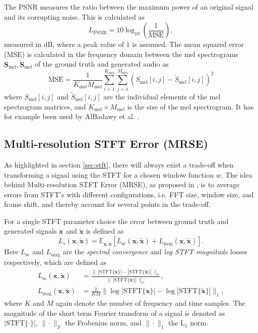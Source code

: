 \documentclass{report}
\begin{document}
The PSNR measures the ratio between the maximum power of an original signal and its corrupting noise. This is calculated as 
\begin{equation}
    L_{\text{PSNR}} = 10 \log_{10}\left(\frac{1}{\text{MSE}}\right),
\end{equation}
measured in dB, where a peak value of 1 is assumed. The mean squared error (MSE) is calculated in the frequency domain between the mel spectrograms $\bm{S}_{\text{mel}}, \tilde{\bm{S}}_{\text{mel}}$ of the ground truth and generated audio as
\begin{equation}
    \text{MSE} = \frac{1}{K_{\text{mel}}M_{\text{mel}}}\sum_{i=1}^{K_{\text{mel}}} \sum_{j=1}^{M_{\text{mel}}} \left( S_{\text{mel}}[i, j] - \tilde{S}_{\text{mel}}[i,j] \right)^2
\end{equation}
where $S_{\text{mel}}[i, j]$ and $\tilde{S}_{\text{mel}}[i,j]$ are the individual elements of the mel spectrogram matrices, and $K_{\text{mel}} \times M_{\text{mel}}$ is the size of the mel spectrogram. It has for example been used by AlBadawy et al. \cite{albadawy2022vocbench}.

\subsection{Multi-resolution STFT Error (MRSE)}
As highlighted in section \ref{sec:stft}, there will always exist a trade-off when transforming a signal using the STFT for a chosen window function $w$. The idea behind Multi-resolution STFT Error (MRSE), as proposed in \cite{yamamoto2020parallel}, is to average errors from STFT's with different configurations, i.e. FFT size, window size, and frame shift, and thereby account for several points in the trade-off.

For a single STFT parameter choice the error between ground truth and generated signals $\bm{x}$ and $\tilde{\bm{x}}$ is defined as
\begin{equation}
    L_s(\bm{x}, \tilde{\bm{x}}) = \mathbb{E}_{\bm{x}, \tilde{\bm{x}}} [L_{\text{sc}}(\bm{x}, \tilde{\bm{x}}) + L_{\text{mag}}(\bm{x}, \tilde{\bm{x}})].
\end{equation}
Here $L_{\text{sc}}$ and $L_{\text{mag}}$ are the \textit{spectral convergence} and \textit{log STFT magnitude} losses respectively, which are defined as
\begin{align}
    L_{\text{sc}}(\bm{x}, \tilde{\bm{x}}) &= \frac{\| \ |\text{STFT}\{\bm{x}\} | - | \text{STFT}\{\tilde{\bm{x}}\}| \ \|_F}{\| \ | \text{STFT}\{\bm{x}\} | \ \|_F}, \\
    L_{\text{mag}}(\bm{x}, \tilde{\bm{x}}) &= \frac{1}{KM} \| \log{| \text{STFT}\{\bm{x}\} | } - \log{| \text{STFT}\{\tilde{\bm{x}}\} |} \|_1,
\end{align}
where $K$ and $M$ again denote the number of frequency and time samples. The magnitude of the short term Fourier transform of a signal is denoted as $|\text{STFT}\{\cdot\}|$, $\|\cdot \|_F$ the Frobenius norm, and $\|\cdot\|_1$ the $\text{L}_1$ norm.
\end{document}
